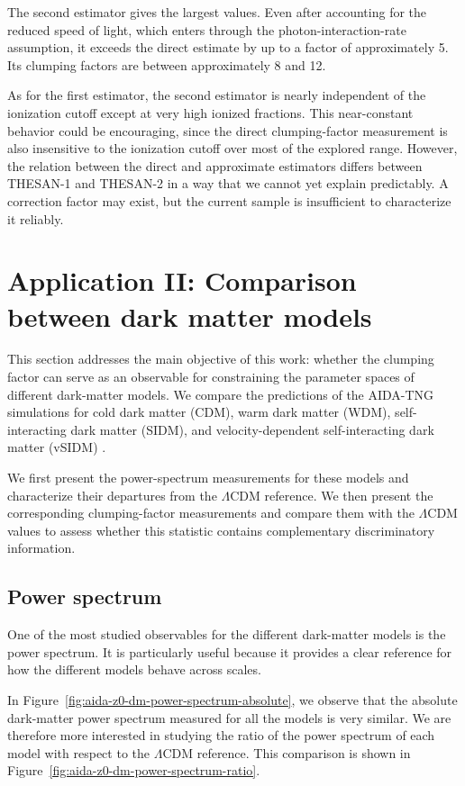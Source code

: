 \documentclass[%
 reprint,
nofootinbib,
 amsmath,amssymb,
 aps,
]{revtex4-2}
\begin{document}
The second estimator gives the largest values. Even after accounting for the reduced speed of light, which enters through the photon-interaction-rate assumption, it exceeds the direct estimate by up to a factor of approximately 5. Its clumping factors are between approximately 8 and 12.

As for the first estimator, the second estimator is nearly independent of the ionization cutoff except at very high ionized fractions. This near-constant behavior could be encouraging, since the direct clumping-factor measurement is also insensitive to the ionization cutoff over most of the explored range. However, the relation between the direct and approximate estimators differs between THESAN-1 and THESAN-2 in a way that we cannot yet explain predictably. A correction factor may exist, but the current sample is insufficient to characterize it reliably.

\section{Application II: Comparison between dark matter models}

This section addresses the main objective of this work: whether the clumping factor can serve as an observable for constraining the parameter spaces of different dark-matter models. We compare the predictions of the AIDA-TNG simulations for cold dark matter (CDM), warm dark matter (WDM), self-interacting dark matter (SIDM), and velocity-dependent self-interacting dark matter (vSIDM) \cite{despali2025aidatng}.

We first present the power-spectrum measurements for these models and characterize their departures from the $\Lambda$CDM reference. We then present the corresponding clumping-factor measurements and compare them with the $\Lambda$CDM values to assess whether this statistic contains complementary discriminatory information.

\subsection{Power spectrum}

One of the most studied observables for the different dark-matter models is the power spectrum. It is particularly useful because it provides a clear reference for how the different models behave across scales.

In Figure~\ref{fig:aida-z0-dm-power-spectrum-absolute}, we observe that the absolute dark-matter power spectrum measured for all the models is very similar. We are therefore more interested in studying the ratio of the power spectrum of each model with respect to the $\Lambda$CDM reference. This comparison is shown in Figure~\ref{fig:aida-z0-dm-power-spectrum-ratio}.
\end{document}
